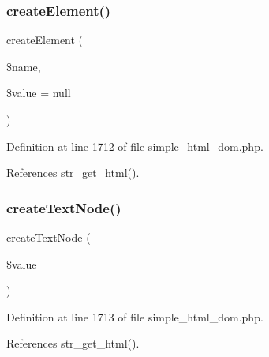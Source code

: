 \subsubsection{\texorpdfstring{create\+Element()}{createElement()}}
{\footnotesize\ttfamily create\+Element (\begin{DoxyParamCaption}\item[{}]{\$name,  }\item[{}]{\$value = {\ttfamily null} }\end{DoxyParamCaption})}



Definition at line 1712 of file simple\+\_\+html\+\_\+dom.\+php.



References str\+\_\+get\+\_\+html().


\hypertarget{classsimple__html__dom_af9ee904e108e5c1956eec226881a9442}{}\label{classsimple__html__dom_af9ee904e108e5c1956eec226881a9442} 
\subsubsection{\texorpdfstring{create\+Text\+Node()}{createTextNode()}}
{\footnotesize\ttfamily create\+Text\+Node (\begin{DoxyParamCaption}\item[{}]{\$value }\end{DoxyParamCaption})}



Definition at line 1713 of file simple\+\_\+html\+\_\+dom.\+php.



References str\+\_\+get\+\_\+html().


\hypertarget{classsimple__html__dom_ad2a305d3f759f9c444d5b2e686586598}{}\label{classsimple__html__dom_ad2a305d3f759f9c444d5b2e686586598} 
